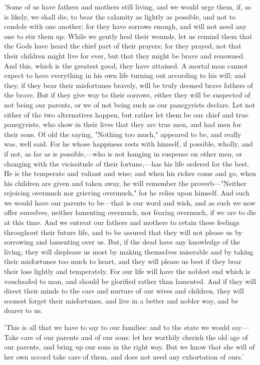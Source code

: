 \documentclass[11pt,letter]{article}
\begin{document}
\par  'Some of us have fathers and mothers still living, and we would urge them, if, as is likely, we shall die, to bear the calamity as lightly as possible, and not to condole with one another; for they have sorrows enough, and will not need any one to stir them up. While we gently heal their wounds, let us remind them that the Gods have heard the chief part of their prayers; for they prayed, not that their children might live for ever, but that they might be brave and renowned. And this, which is the greatest good, they have attained. A mortal man cannot expect to have everything in his own life turning out according to his will; and they, if they bear their misfortunes bravely, will be truly deemed brave fathers of the brave. But if they give way to their sorrows, either they will be suspected of not being our parents, or we of not being such as our panegyrists declare. Let not either of the two alternatives happen, but rather let them be our chief and true panegyrists, who show in their lives that they are true men, and had men for their sons. Of old the saying, "Nothing too much," appeared to be, and really was, well said. For he whose happiness rests with himself, if possible, wholly, and if not, as far as is possible,—who is not hanging in suspense on other men, or changing with the vicissitude of their fortune,—has his life ordered for the best. He is the temperate and valiant and wise; and when his riches come and go, when his children are given and taken away, he will remember the proverb—"Neither rejoicing overmuch nor grieving overmuch," for he relies upon himself. And such we would have our parents to be—that is our word and wish, and as such we now offer ourselves, neither lamenting overmuch, nor fearing overmuch, if we are to die at this time. And we entreat our fathers and mothers to retain these feelings throughout their future life, and to be assured that they will not please us by sorrowing and lamenting over us. But, if the dead have any knowledge of the living, they will displease us most by making themselves miserable and by taking their misfortunes too much to heart, and they will please us best if they bear their loss lightly and temperately. For our life will have the noblest end which is vouchsafed to man, and should be glorified rather than lamented. And if they will direct their minds to the care and nurture of our wives and children, they will soonest forget their misfortunes, and live in a better and nobler way, and be dearer to us.

\par  'This is all that we have to say to our families: and to the state we would say—Take care of our parents and of our sons: let her worthily cherish the old age of our parents, and bring up our sons in the right way. But we know that she will of her own accord take care of them, and does not need any exhortation of ours.'
\end{document}
